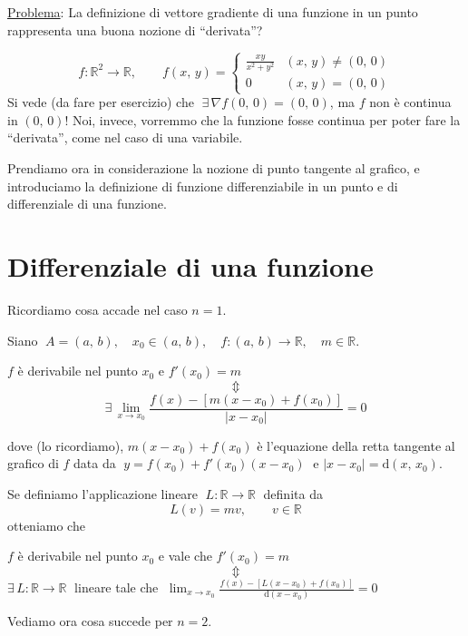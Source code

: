 \underline{Problema}: La definizione di vettore gradiente di una funzione in un punto rappresenta una buona nozione di ``derivata''?

\begin{example}
$$
f:\mathbb{R}^2 \longrightarrow \mathbb{R}, \qquad
f(x,\,y) =
\begin{cases}
\frac{xy}{x^2+y^2} & (x,\,y) \neq (0,\,0) \\
0 & (x,\,y) = (0,\,0)
\end{cases}
$$
Si vede (da fare per esercizio) che $\; \exists \, \nabla f(0,\,0) = (0,\,0)$, ma $f$ non è continua in $(0,\,0)$! Noi, invece, vorremmo che la funzione fosse continua per poter fare la ``derivata'', come nel caso di una variabile.
\end{example}

Prendiamo ora in considerazione la nozione di punto tangente al grafico, e introduciamo la definizione di funzione differenziabile in un punto e di differenziale di una funzione.


\section{Differenziale di una funzione}
Ricordiamo cosa accade nel caso $n=1$.

\begin{exer}
Siano $\; A=(a,\,b), \quad x_0 \in (a,\,b), \quad f:(a,\,b) \longrightarrow \mathbb{R}, \quad m \in \mathbb{R}$.
\begin{center}
$f$ è derivabile nel punto $x_0$ e $f'(x_0)=m$
$$\Updownarrow$$
$$\exists \, \lim_{x \rightarrow x_0} \frac{f(x)-\left[m(x-x_0)+f(x_0)\right]}{|x-x_0|} = 0$$
\end{center}
dove (lo ricordiamo), $m(x-x_0)+f(x_0)$ è l'equazione della retta tangente al grafico di $f$ data da $\; y= f(x_0)+f'(x_0)(x-x_0)\;$ e $|x-x_0|=\mathrm{d}(x,\,x_0)$.

Se definiamo l'applicazione lineare $\;L:\mathbb{R}\longrightarrow\mathbb{R}\;$ definita da
$$L(v)=mv, \qquad v \in \mathbb{R}$$
otteniamo che
\begin{center}
$f$ è derivabile nel punto $x_0$ e vale che $f'(x_0)=m$
$$\Updownarrow$$
$\exists \, L:\mathbb{R}\longrightarrow\mathbb{R}\;$ lineare tale che $\; \displaystyle \lim_{x \rightarrow x_0} \frac{f(x)-\left[L(x-x_0)+f(x_0)\right]}{\mathrm{d}(x-x_0)} = 0$
\end{center}
\end{exer}

Vediamo ora cosa succede per $n=2$.

